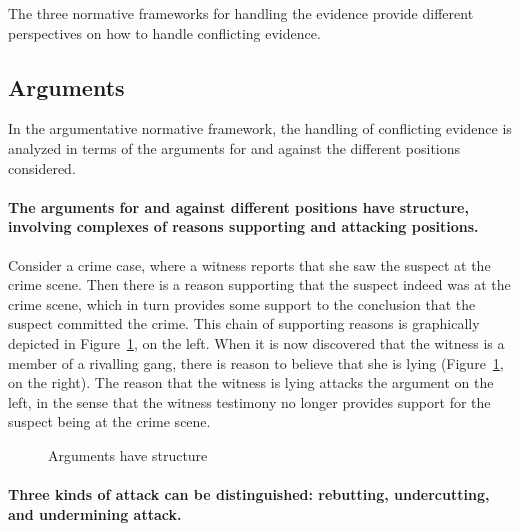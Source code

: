 \documentclass[10pt]{article}
\begin{document}
The three normative frameworks for handling the evidence provide different perspectives on how to handle conflicting evidence.


\subsection{Arguments}
\label{sec:confArg}


In the argumentative normative framework, the handling of conflicting evidence is analyzed in terms of the arguments for and against the different positions considered.

\paragraph{The arguments for and against different positions have structure, involving complexes of reasons supporting and attacking positions.} 

Consider a crime case, where a witness reports that she saw the suspect at the crime scene. Then there is a reason supporting that the suspect indeed was at the crime scene, which in turn provides some support to the conclusion that the suspect committed the crime. This chain of supporting reasons is graphically depicted in Figure~\ref{fig:arg2}, on the left. When it is now discovered that the witness is a member of a rivalling gang, there is reason to believe that she is lying (Figure~\ref{fig:arg2}, on the right). The reason that the witness is lying attacks the argument on the left, in the sense that the witness testimony no longer provides support for the suspect being at the crime scene.

\begin{figure}[bt]
\centering

\caption{Arguments have structure\label{fig:arg2}}
\end{figure}


\paragraph{Three kinds of attack can be distinguished: rebutting, undercutting, and undermining attack.}
\end{document}
